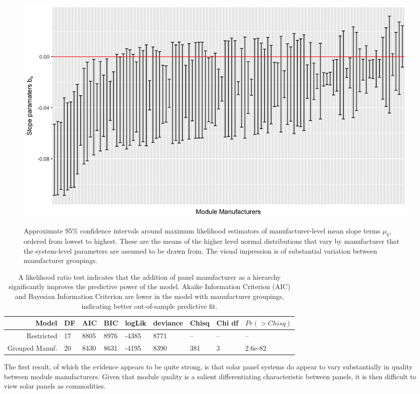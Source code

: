 \documentclass[a4paper]{article}
\begin{document}
\begin{figure}
  \caption{Approximate 95\% confidence intervals around maximum likelihood estimators of manufacturer-level mean slope terms $\mu_b$, ordered from lowest to highest. These are the means of the higher level normal distributions that vary by manufacturer that the system-level parameters are assumed to be drawn from. The visual impression is of substantial variation between manufacturer groupings.}
  \includegraphics[width=1\linewidth]{figures/nested_manuf_fig_final.png}
  \label{sfig:nested_manuf_fig}
\end{figure}

\begin{table}
  \begin{tabular}{rllllllll}
  \toprule
    Model &  DF &   AIC &   BIC &  logLik &  deviance &  Chisq &  Chi df &  $Pr(>Chisq)$ \\
    \midrule
             Restricted &  17 &  8805 &  8976 &   -4385 &      8771 &     -- &      -- &          -- \\
    Grouped Manuf. &  20 &  8430 &  8631 &   -4195 &      8390 &    381 &       3 &     2.6e-82 \\
  \bottomrule
  \end{tabular}
  \label{tbl:lm_commodity}
  \caption{A likelihood ratio test indicates that the addition of panel manufacturer as a hierarchy significantly improves the predictive power of the model. Akaike Information Criterion (AIC) and Bayesian Information Criterion are lower in the model with manufacturer groupings, indicating better out-of-sample predictive fit.}
\end{table}

The first result, of which the evidence appears to be quite strong, is that solar panel systems do appear to vary substantially in quality between module manufacturers. Given that module quality is a salient differentiating characteristic between panels, it is then difficult to view solar panels as commodities.
\end{document}
